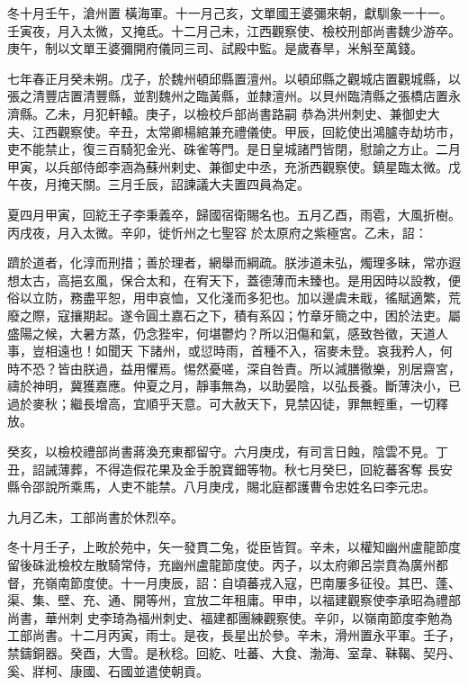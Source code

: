 \begin{pinyinscope}
 冬十月壬午，滄州置
 橫海軍。十一月己亥，文單國王婆彌來朝，獻馴象一十一。壬寅夜，月入太微，又掩氐。十二月己未，江西觀察使、檢校刑部尚書魏少游卒。庚午，制以文單王婆彌開府儀同三司、試殿中監。是歲春旱，米斛至萬錢。



 七年春正月癸未朔。戊子，於魏州頓邱縣置澶州。以頓邱縣之觀城店置觀城縣，以張之清豐店置清豐縣，並割魏州之臨黃縣，並隸澶州。以貝州臨清縣之張橋店置永濟縣。乙未，月犯軒轅。庚子，以檢校戶部尚書路嗣
 恭為洪州刺史、兼御史大夫、江西觀察使。辛丑，太常卿楊綰兼充禮儀使。甲辰，回紇使出鴻臚寺劫坊市，吏不能禁止，復三百騎犯金光、硃雀等門。是日皇城諸門皆閉，慰諭之方止。二月甲寅，以兵部侍郎李涵為蘇州剌史、兼御史中丞，充浙西觀察使。鎮星臨太微。戊午夜，月掩天關。三月壬辰，詔諫議大夫置四員為定。



 夏四月甲寅，回紇王子李秉義卒，歸國宿衛賜名也。五月乙酉，雨雹，大風折樹。丙戌夜，月入太微。辛卯，徙忻州之七聖容
 於太原府之紫極宮。乙未，詔：



 躋於道者，化淳而刑措；善於理者，網舉而綱疏。朕涉道未弘，燭理多昧，常亦遐想太古，高挹玄風，保合太和，在宥天下，蓋德薄而未臻也。是用因時以設教，便俗以立防，務盡平恕，用申哀恤，又化淺而多犯也。加以邊虞未戢，徭賦適繁，荒廢之際，寇攘期起。遂令圓土嘉石之下，積有系囚；竹章牙簡之中，困於法吏。屬盛陽之候，大暑方蒸，仍念狴牢，何堪鬱灼？所以汨傷和氣，感致咎徵，天道人事，豈相遠也！如聞天
 下諸州，或愆時雨，首種不入，宿麥未登。哀我矜人，何時不恐？皆由朕過，益用懼焉。惕然憂嗟，深自咎責。所以減膳徹樂，別居齋宮，禱於神明，冀獲嘉應。仲夏之月，靜事無為，以助晏陰，以弘長養。斷薄決小，已過於麥秋；繼長增高，宜順乎天意。可大赦天下，見禁囚徒，罪無輕重，一切釋放。



 癸亥，以檢校禮部尚書蔣渙充東都留守。六月庚戌，有司言日蝕，陰雲不見。丁丑，詔誡薄葬，不得造假花果及金手脫寶鈿等物。秋七月癸巳，回紇蕃客奪
 長安縣令邵說所乘馬，人吏不能禁。八月庚戌，賜北庭都護曹令忠姓名曰李元忠。



 九月乙未，工部尚書於休烈卒。



 冬十月壬子，上畋於苑中，矢一發貫二兔，從臣皆賀。辛未，以權知幽州盧龍節度留後硃泚檢校左散騎常侍，充幽州盧龍節度使。丙子，以太府卿呂崇賁為廣州都督，充嶺南節度使。十一月庚辰，詔：自頃蕃戎入寇，巴南屢多征役。其巴、蓬、渠、集、壁、充、通、開等州，宜放二年租庸。甲申，以福建觀察使李承昭為禮部尚書，華州刺
 史李琦為福州刺史、福建都團練觀察使。辛卯，以嶺南節度李勉為工部尚書。十二月丙寅，雨士。是夜，長星出於參。辛未，滑州置永平軍。壬子，禁鑄銅器。癸酉，大雪。是秋稔。回紇、吐蕃、大食、渤海、室韋、靺鞨、契丹、奚、牂柯、康國、石國並遣使朝貢。




\end{pinyinscope}
